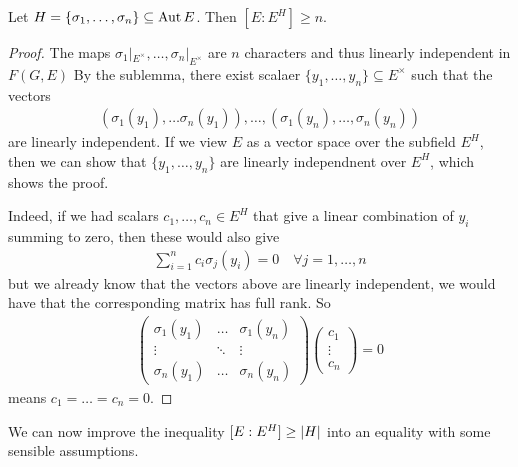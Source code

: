 \begin{lem}[]\label{lem:4-7}
  Let $H = \{\sigma_1, \ldots, \sigma_n\} \subseteq \operatorname{Aut} E$. Then $[E:E^{H}] \geq n$.
\end{lem}
\begin{proof}
  The maps $\sigma_1|_{E^{\times}}, \ldots, \sigma_n|_{E^{\times}}$ are $n$ characters and thus linearly independent in $F(G,E)$
  By the sublemma, there exist scalaer $\{y_{1}, \ldots, y_{n}\} \subseteq E^{\times}$ such that the vectors
  \begin{align*}
    (\sigma_1(y_1), \ldots \sigma_n(y_1)), \ldots , (\sigma_1(y_n), \ldots, \sigma_n(y_n))
  \end{align*}
  are linearly independent.
  If we view $E$ as a vector space over the subfield $E^{H}$, then we can show that $\{y_{1}, \ldots, y_{n}\}$ are linearly independnent over $E^{H}$, which shows the proof.

  Indeed, if we had scalars $c_{1}, \ldots, c_{n} \in E^{H}$ that give a linear combination of $y_i$ summing to zero, then these would also give
  \begin{align*}
    \sum_{i=1}^{n}c_i \sigma_j(y_i) = 0 \quad \forall j = 1, \ldots, n
  \end{align*}
  but we already know that the vectors above are linearly independent, we would have that the corresponding matrix has full rank.
  So
  \begin{align*}
    \begin{pmatrix}
      \sigma_1(y_1) & \ldots & \sigma_1(y_n)\\
    \vdots & \ddots & \vdots\\
    \sigma_n(y_1) & \ldots & \sigma_n(y_n)
    \end{pmatrix}
    \begin{pmatrix}
    c_1\\
    \vdots\\
    c_n
    \end{pmatrix}
    =
    0
  \end{align*}
  means $c_1 = \ldots = c_n = 0$.
\end{proof}

We can now improve the inequality $[E:E^{H}] \geq \vert H\vert$ into an equality with some sensible assumptions.


